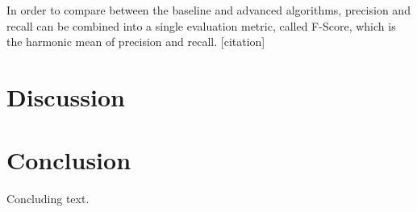 \documentclass[11pt]{article}
\begin{document}
In order to compare between the baseline and advanced algorithms, precision and recall can be combined into a single evaluation metric, called F-Score, which is the harmonic mean of precision and recall. [citation]

\section{Discussion}


\section{Conclusion}

Concluding text.



\end{document}

